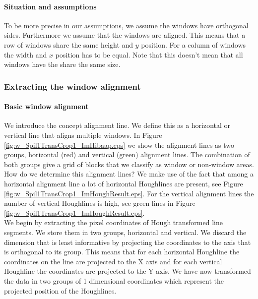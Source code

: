 \paragraph{Situation and assumptions}
To be more precise in our assumptions, we assume the windows have orthogonal
sides.  Furthermore we assume that the windows are aligned. This means that a
row of windows share the same height and $y$ position. For a column of windows
the width and $x$ position has to be equal.  Note that this doesn't mean that
all windows have the share the same size.



\subsubsection{Extracting the window alignment}
\paragraph{Basic window alignment}
We introduce the concept alignment line. We define this as a horizontal or
vertical line that aligns multiple windows. In Figure
\ref{fig:w_Spil1TransCrop1_ImHibaap.eps}
we show the alignment lines as two groups, horizontal (red) and
vertical (green) alignment lines.  The combination of both groups give a grid of
blocks that we classify as window or non-window areas.\\

How do we determine this alignment lines? We make use of the fact that among a
horizontal alignment line a lot of horizontal Houghlines are present, see
Figure \ref{fig:w_Spil1TransCrop1_ImHoughResult.eps}. For the vertical alignment lines
the number of vertical Houghlines is high, see green lines in Figure
\ref{fig:w_Spil1TransCrop1_ImHoughResult.eps}.\\

We begin by extracting the pixel coordinates of Hough transformed line
segments. We store them in two groups, horizontal and vertical.%
We discard the dimension that is least informative by projecting the coordinates to
the axis that is orthogonal to its group. 
This means that for each horizontal Houghline the coordinates on the line are projected to the X
axis and for each vertical Houghline the coordinates are projected to the Y
axis. We have now transformed the data in two groups of 1 dimensional
coordinates which represent the projected position of the Houghlines.\\

